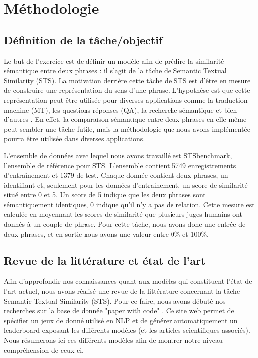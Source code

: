 \documentclass[11pt,a4paper, french]{article}
\begin{document}
%

\section{Méthodologie}


\subsection{Définition de la tâche/objectif}
Le but de l’exercice est de définir un modèle afin de prédire la similarité sémantique entre deux phrases : il s'agit de la tâche de Semantic Textual Similarity (STS). La motivation derrière cette tâche de STS est d’être en mesure de construire une représentation du sens d’une phrase. L’hypothèse est que cette représentation peut être utilisée pour diverses applications comme la traduction machine (MT), les questions-réponses (QA), la recherche sémantique et bien d’autres \cite{Cer_2017}. En effet, la comparaison sémantique entre deux phrases en elle même peut sembler une tâche futile, mais la méthodologie que nous avons implémentée pourra être utilisée dans diverses applications.

	L’ensemble de données avec lequel nous avons travaillé est STSbenchmark, l’ensemble de référence pour STS. L’ensemble contient 5749 enregistrements d'entraînement et 1379 de test. Chaque donnée contient deux phrases, un identifiant et, seulement pour les données d'entrainement, un score de similarité situé entre 0 et 5. Un score de 5 indique que les deux phrases sont sémantiquement identiques, 0 indique qu’il n’y a pas de relation. Cette mesure est calculée en moyennant les scores de similarité que plusieurs juges humains ont donnés à un couple de phrase. Pour cette tâche, nous avons donc une entrée de deux phrases, et en sortie nous avons une valeur entre 0\% et 100\%.

\subsection{Revue de la littérature et état de l'art}
Afin d'approfondir nos connaissances quant aux modèles qui constituent l'état de l'art actuel, nous avons réalisé une revue de la littérature concernant la tâche Semantic Textual Similarity (STS). Pour ce faire, nous avons débuté nos recherches sur la base de donnée "paper with code" \cite{sota}. Ce site web permet de spécifier un jeux de donné utilisé en NLP et de générer automatiquement un leaderboard exposant les différents modèles (et les articles scientifiques associés). Nous résumerons ici ces différents modèles afin de montrer notre niveau compréhension de ceux-ci. 
\end{document}
